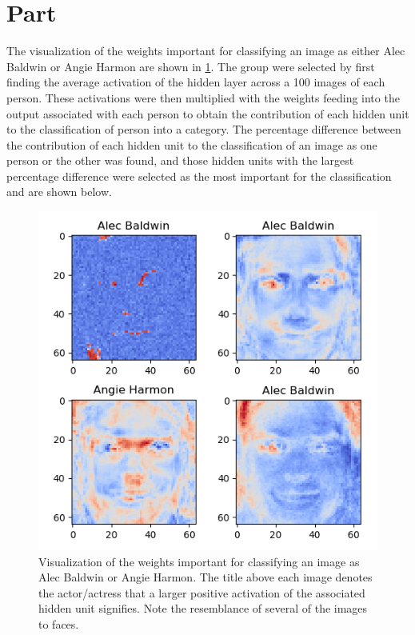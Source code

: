 \documentclass{article}
\newcommand{\enterproblemHeader}[1]{
}
\newcommand{\exitproblemHeader}[1]{
}
\newcounter{problem} %
\newcommand{\problemName}{}
\newenvironment{problem}[1][Part \theproblem]{ %
	\stepcounter{problem} %
	\renewcommand{\problemName}{#1} %
	\section{\problemName} %
	\enterproblemHeader{\problemName} %
}{
	\exitproblemHeader{\problemName} %
}
\begin{document}
\FloatBarrier
\begin{problem}
	The visualization of the weights important for classifying an image as either Alec Baldwin or Angie Harmon are shown in \cref{q9}. The group were selected by first finding the average activation of the hidden layer across a 100 images of each person. These activations were then multiplied with the weights feeding into the output associated with each person to obtain the contribution of each hidden unit to the classification of person into a category. The percentage difference between the contribution of each hidden unit to the classification of an image as one person or the other was found, and those hidden units with the largest percentage difference were selected as the most important for the classification and are shown below.
	
	\begin{figure}
		\includegraphics[width=\linewidth]{q9}
		\caption{Visualization of the weights important for classifying an image as Alec Baldwin or Angie Harmon. The title above each image denotes the actor/actress that a larger positive activation of the associated hidden unit signifies. Note the resemblance of several of the images to faces.}
		\label{q9}
	\end{figure}
	
\end{problem}
\clearpage
\end{document}
